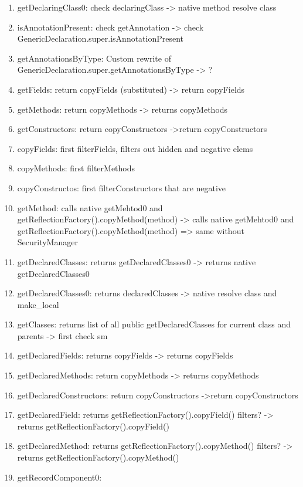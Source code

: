 \begin{enumerate}
    \item getDeclaringClass0: check declaringClass -> native method resolve class
    \item isAnnotationPresent: check getAnnotation -> check GenericDeclaration.super.isAnnotationPresent
    \item getAnnotationsByType: Custom rewrite of GenericDeclaration.super.getAnnotationsByType -> ?
    \item getFields: return copyFields (substituted) -> return copyFields
    \item getMethods: return copyMethods -> returns copyMethods
    \item getConstructors: return copyConstructors ->return copyConstructors
    \item copyFields: first filterFields, filters out hidden and negative elems
    \item copyMethods: first filterMethods
    \item copyConstructos: first filterConstructors that are negative
    \item getMethod: calls native getMehtod0 and getReflectionFactory().copyMethod(method) -> calls native getMehtod0 and getReflectionFactory().copyMethod(method) => same without SecurityManager
    \item getDeclaredClasses: returns getDeclaredClasses0 -> returns native getDeclaredClasses0
    \item getDeclaredClasses0: returns declaredClasses -> native resolve class and make\_local
    \item getClasses: returns list of all public getDeclaredClasses for current class and parents -> first check sm
    \item getDeclaredFields: returns copyFields -> returns copyFields
    \item getDeclaredMethods: return copyMethods -> returns copyMethods
    \item getDeclaredConstructors: return copyConstructors ->return copyConstructors
    \item getDeclaredField: returns getReflectionFactory().copyField() filters? -> returns getReflectionFactory().copyField()
    \item getDeclaredMethod: returns getReflectionFactory().copyMethod() filters? -> returns getReflectionFactory().copyMethod()
    
    \item getRecordComponent0:


\end{enumerate}
